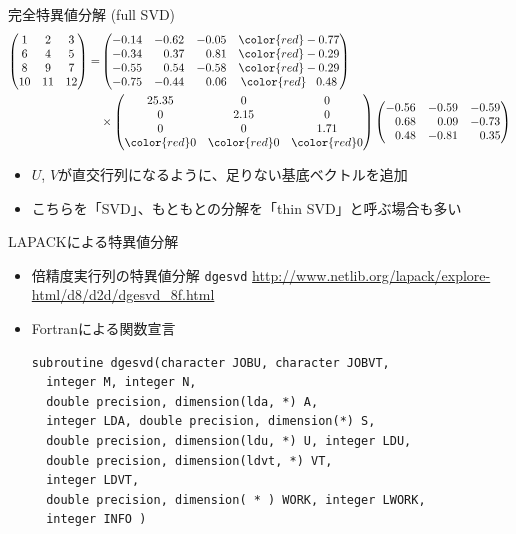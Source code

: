 \begin{frame}[t,fragile]{完全特異値分解 (full SVD)}
  \[
  \begin{split}
    \begin{pmatrix}
      1 & 2 & 3 \\
      6 & 4 & 5 \\
      8 & 9 & 7 \\
      10 & 11 & 12
    \end{pmatrix} =&
    \begin{pmatrix}
      -0.14 & -0.62 & -0.05 & {\color{red} -0.77} \\
      -0.34 & \ \ \,0.37 & \ \ \,0.81 & {\color{red} -0.29} \\
      -0.55 & \ \ \,0.54 & -0.58 & {\color{red} -0.29} \\
      -0.75 & -0.44 & \ \ \,0.06 & {\color{red} \ \ \,0.48}
    \end{pmatrix} \\
    &\times
    \begin{pmatrix}
      25.35 & 0 & 0 \\
      0 & 2.15 & 0 \\
      0 & 0 & 1.71 \\
      {\color{red} 0} & {\color{red} 0} & {\color{red} 0}
    \end{pmatrix}
    \begin{pmatrix}
      -0.56 & -0.59 & -0.59 \\
      \ \ \,0.68 & \ \ \,0.09 & -0.73 \\
      \ \ \,0.48 & -0.81 & \ \ \,0.35
    \end{pmatrix}
  \end{split}
  \]
  \begin{itemize}
  \item $U$, $V$が直交行列になるように、足りない基底ベクトルを追加
  \item こちらを「SVD」、もともとの分解を「thin SVD」と呼ぶ場合も多い
  \end{itemize}
\end{frame}

\begin{frame}[t,fragile]{LAPACKによる特異値分解}
  \begin{itemize}
    \setlength{\itemsep}{1em}
  \item 倍精度実行列の特異値分解 {\tt dgesvd}
    \url{http://www.netlib.org/lapack/explore-html/d8/d2d/dgesvd_8f.html}
  \item Fortranによる関数宣言
\begin{lstlisting}
subroutine dgesvd(character JOBU, character JOBVT,
  integer M, integer N,
  double precision, dimension(lda, *) A,
  integer LDA, double precision, dimension(*) S,
  double precision, dimension(ldu, *) U, integer LDU,
  double precision, dimension(ldvt, *) VT,
  integer LDVT,
  double precision, dimension( * ) WORK, integer LWORK,
  integer INFO )
\end{lstlisting}
  \end{itemize}
\end{frame}

